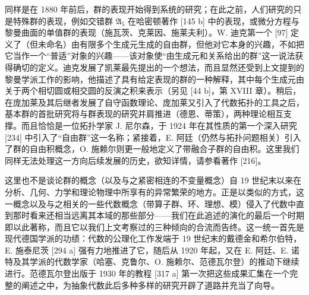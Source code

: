同样是在 1880 年前后，群的表现开始得到系统的研究；在此之前，人们研究的只是特殊群的表现，例如交错群 \(\mathfrak{A}_5\) 在哈密顿著作 {[}145 b{]} 中的表现，或微分方程与黎曼曲面的单值群的表现（施瓦茨、克莱因、施莱夫利）。W. 迪克第一个 {[}97{]} 定义了（但未命名）由有限多个生成元生成的自由群，但他对它本身的兴趣，不如把它当作一个“普适”对象的兴趣——该对象使“由生成元和关系给出的群”这一说法获得确切的定义。迪克发展了凯莱最先提出的一个想法，而且显然还受到上文提到的黎曼学派工作的影响，他描述了具有给定表现的群的一种解释，其中每个生成元由关于两个相切圆或相交圆的反演之积来表示（另见 {[}44 b{]}，第 XVIII 章）。稍后，在庞加莱及其后继者发展了自守函数理论、庞加莱又引入了代数拓扑的工具之后，基本群的首批研究将与群表现的研究并肩推进（德恩、蒂策），两种理论相互支撑。而且恰恰是一位拓扑学家 J. 尼尔森，于 1924 年在其性质的第一个深入研究 {[}234{]} 中引入了“自由群”这一名称；紧接着，E. 阿廷（仍然与拓扑问题相关）引入了群的自由积概念，O. 施赖尔则更一般地定义了带融合子群的自由积。这里我们同样无法处理这一方向后续发展的历史，欲知详情，请参看著作 {[}216{]}。

这里也不是谈论群的概念（以及与之紧密相连的不变量概念）自 19 世纪末以来在分析、几何、力学和理论物理中所享有的异常繁荣的地方。正是以类似的方式，这一概念以及与之相关的一些代数概念（带算子群、环、理想、模）侵入了代数中直到那时看来还相当远离其本域的那些部分——我们在此追述的演化的最后一个时期即以此著称，而且它以我们上文考察过的三种倾向的合流而告终。这一统一首先是现代德国学派的功绩：代数的公理化工作发端于 19 世纪末的戴德金和希尔伯特，E. 施泰尼茨 {[}294 a{]} 强有力地推进了它，随后从 1920 年起，又在 E. 阿廷、E. 诺特及其学派的代数学家（哈塞、克鲁尔、O. 施赖尔、范德瓦尔登）的推动下继续进行。范德瓦尔登出版于 1930 年的教程 {[}317 a{]} 第一次把这些成果汇集在一个完整的阐述之中，为抽象代数此后多种多样的研究开辟了道路并充当了向导。
\relax{}
